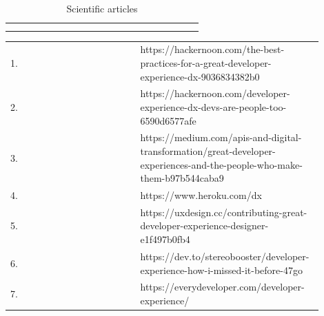 \documentclass[english, 12pt, a4paper, sci, utf8, a-1b, online]{aaltothesis}
\begin{document}
\begin{center}
\begin{longtable}{p{0.05\linewidth}p{0.35\linewidth}p{0.5\linewidth}}
    \captionsetup{width=0.6\textwidth}                                                                                                                                                                        \\
    \caption{Scientific articles}                                                                                                                                                                             \\
  \end{longtable}
\end{center}

\begin{center}
  \begin{longtable}{p{0.05\linewidth}p{0.35\linewidth}p{0.5\linewidth}}
    \label{table:grey-literature}                                                                                                                                                                    \\
    1.  & \textcite{the-best-practices-for-a-great-dx}                    & https://hackernoon.com/the-best-practices-for-a-great-developer-experience-dx-9036834382b0                               \\
    2.  & \textcite{dx-devs-are-people-too}                               & https://hackernoon.com/developer-experience-dx-devs-are-people-too-6590d6577afe                                          \\
    3.  & \textcite{great-dx-and-the-people-who-make-them}                & https://medium.com/apis-and-digital-transformation/great-developer-experiences-and-the-people-who-make-them-b97b544caba9 \\
    4.  & \textcite{heroku-dx}                                            & https://www.heroku.com/dx                                                                                                \\
    5.  & \textcite{contributing-as-a-designer}                           & https://uxdesign.cc/contributing-great-developer-experience-designer-e1f497b0fb4                                         \\
    6.  & \textcite{how-i-missed-it-before}                               & https://dev.to/stereobooster/developer-experience-how-i-missed-it-before-47go                                            \\
    7.  & \textcite{what-is-developer-experience-everydeveloper}          & https://everydeveloper.com/developer-experience/                                                                         \\

\end{longtable}
\end{center}
\end{document}
